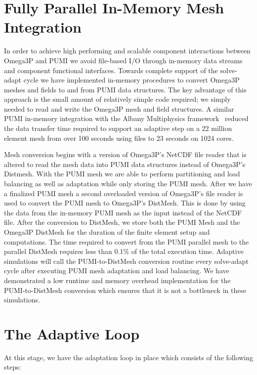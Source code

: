 \documentclass[review,12pt]{elsarticle_summary_report}
\begin{document}

\section{\label{in_memory}Fully Parallel In-Memory Mesh Integration}
In order to achieve high performing and scalable component interactions between
Omega3P and PUMI we avoid
file-based I/O through in-memory data streams and component functional
interfaces. Towards complete support of the solve-adapt cycle we have implemented in-memory
procedures to convert Omega3P meshes and fields to and from  PUMI data structures.
The key advantage of this approach is the small amount of relatively simple code
required; we simply needed to read and write the Omega3P mesh and field
structures.
A similar PUMI in-memory integration with the Albany Multiphysics
framework~\cite{salinger2013albany,Albany2015} reduced the data transfer time
required to support an adaptive step on a 22 million element mesh from over 100
seconds using files to 23 seconds on 1024 cores.

Mesh conversion begins with a version of Omega3P's NetCDF file reader that is altered
to read the mesh data into PUMI data structures instead of Omega3P's Distmesh. With 
the PUMI mesh we are able to perform partitioning and load balancing as well as adaptation 
while only storing the PUMI mesh. After we have a finalized PUMI mesh a second 
overloaded version of Omega3P's file reader is used to convert the PUMI mesh to 
Omega3P's DistMesh. This is done by using the data from the in-memory PUMI mesh as the 
input instead of the NetCDF file. After the conversion to DistMesh, we store both the
PUMI Mesh and the Omega3P DistMesh for the duration of the finite element setup and 
computations. The time required to convert from the PUMI parallel mesh to the
parallel DistMesh requires less than 0.1\% of the total execution time.
Adaptive simulations will call the PUMI-to-DistMesh conversion routine every
solve-adapt cycle after executing PUMI mesh adaptation and load balancing.
We have demonstrated a low runtime and memory overhead implementation for the
PUMI-to-DistMesh conversion which ensures that it is not a bottleneck
in these simulations.


\clearpage
\newpage

\section{\label{adaptive_loop}The Adaptive Loop}
At this stage, we have the adaptation loop in place which consists of the following steps:
\end{document}
